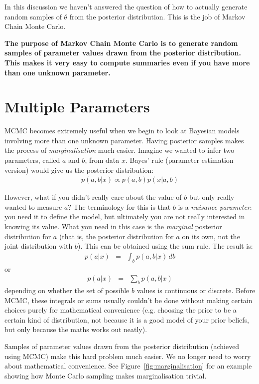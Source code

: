 In this discussion we haven't answered the question of how to actually generate
random samples of $\theta$ from the posterior distribution. This is the job
of Markov Chain Monte Carlo.

\begin{framed}
{\bf
The purpose of Markov Chain Monte Carlo is to generate random samples of
parameter values drawn from the posterior distribution. This makes it very easy
to compute summaries even if you have more than one unknown parameter.}
\end{framed}

\section{Multiple Parameters}
MCMC becomes extremely useful when we begin to look at Bayesian models involving
more than one unknown parameter. 
Having posterior samples makes the process of {\it marginalisation}
much easier. Imagine we wanted to infer two parameters, called $a$ and $b$,
from
data $x$. Bayes' rule (parameter estimation version) would give us the posterior
distribution:
\begin{eqnarray}
p(a, b | x) \propto p(a, b)p(x|a,b)
\end{eqnarray}

However, what if you didn't really care about the value of $b$ but
only really wanted to measure $a$? The terminology for this is that $b$ is a
{\it nuisance parameter}: you need it to define the model, but ultimately you
are not really interested in knowing its value.
What you need in this case is the
{\it marginal} posterior distribution for $a$ (that is, the posterior
distribution for $a$ on its own, not the joint distribution with $b$).
This can be obtained using the sum rule. The result is:
\begin{eqnarray}
p(a | x) &=& \int_b p(a, b|x) \, db
\end{eqnarray}
or
\begin{eqnarray}
p(a | x) &=& \sum_{b} p(a, b|x)
\end{eqnarray}
depending on whether the set of possible $b$ values is continuous or discrete.
Before MCMC, these integrals or sums usually couldn't be done without making
certain choices purely for mathematical convenience (e.g. choosing the prior
to be a certain kind of distribution, not because it is a good model of your
prior beliefs, but only because the maths works out neatly).

Samples of parameter values drawn from the posterior distribution
(achieved using MCMC) make this hard problem much easier. We no longer need
to worry about mathematical convenience.
See Figure~\ref{fig:marginalisation} for an example showing how Monte Carlo
sampling makes marginalisation trivial.


